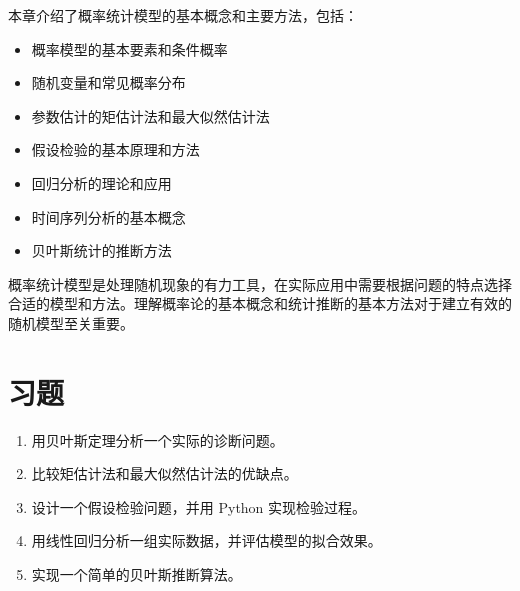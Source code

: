 本章介绍了概率统计模型的基本概念和主要方法，包括：

\begin{itemize}
    \item 概率模型的基本要素和条件概率
    \item 随机变量和常见概率分布
    \item 参数估计的矩估计法和最大似然估计法
    \item 假设检验的基本原理和方法
    \item 回归分析的理论和应用
    \item 时间序列分析的基本概念
    \item 贝叶斯统计的推断方法
\end{itemize}

\begin{definitionbox}[title=本章要点]
概率统计模型是处理随机现象的有力工具，在实际应用中需要根据问题的特点选择合适的模型和方法。理解概率论的基本概念和统计推断的基本方法对于建立有效的随机模型至关重要。
\end{definitionbox}

\section*{习题}

\begin{enumerate}
    \item 用贝叶斯定理分析一个实际的诊断问题。
    
    \item 比较矩估计法和最大似然估计法的优缺点。
    
    \item 设计一个假设检验问题，并用 Python 实现检验过程。
    
    \item 用线性回归分析一组实际数据，并评估模型的拟合效果。
    
    \item 实现一个简单的贝叶斯推断算法。
\end{enumerate} 